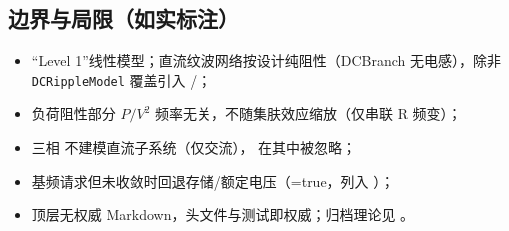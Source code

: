 \documentclass[UTF8,fontset=fandol,a4paper,11pt]{ctexart}
\begin{document}
\subsection{边界与局限（如实标注）}
\begin{itemize}
  \item “Level 1”线性模型；直流纹波网络按设计纯阻性（DCBranch 无电感），除非
        \texttt{DCRippleModel} 覆盖引入 /；
  \item 负荷阻性部分 $P/V^2$ 频率无关，不随集肤效应缩放（仅串联 R 频变）；
  \item 三相  不建模直流子系统（仅交流），
         在其中被忽略；
  \item 基频请求但未收敛时回退存储/额定电压（=true，列入
        ）；
  \item 顶层无权威 Markdown，头文件与测试即权威；归档理论见
        。
\end{itemize}

\end{document}
